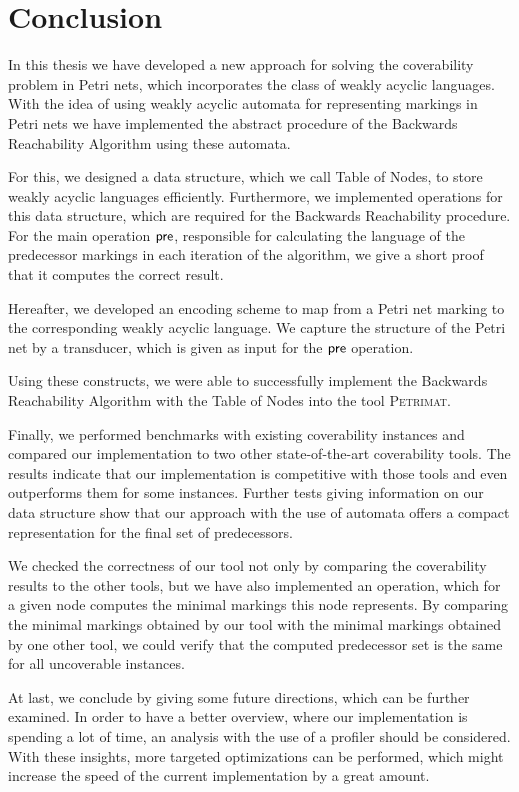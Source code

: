 \chapter{Conclusion}\label{chapter:conclusion}

In this thesis we have developed a new approach for solving the coverability problem in Petri nets, which incorporates the class of weakly acyclic languages. With the idea of using weakly acyclic automata for representing markings in Petri nets we have implemented the abstract procedure of the Backwards Reachability Algorithm using these automata.
 
For this, we designed a data structure,  which we call Table of Nodes, to store weakly acyclic languages efficiently. Furthermore, we implemented operations for this data structure, which are required for the Backwards Reachability procedure. 
For the main operation $\operatorname{\textsf{pre}}$, responsible for calculating the language of the predecessor markings in each iteration of the algorithm, we give a short proof that it computes the correct result.

Hereafter, we developed an encoding scheme to map from a Petri net marking to the corresponding weakly acyclic language. We capture the structure of the Petri net by a transducer, which is given as input for the $\operatorname{\textsf{pre}}$ operation. 

Using these constructs, we were able to successfully implement the Backwards Reachability Algorithm with the Table of Nodes into the tool \textsc{Petrimat}.

Finally, we performed benchmarks with existing coverability instances and compared our implementation to two other state-of-the-art coverability tools.
The results indicate that our implementation is competitive with those tools and even outperforms them for some instances. Further tests giving information on our data structure show that our approach with the use of automata offers a compact representation for the final set of predecessors. 

We checked the correctness of our tool not only by comparing the coverability results to the other tools, but we have also implemented an operation, which for a given node computes the minimal markings this node represents. By comparing the minimal markings obtained by our tool with the minimal markings obtained by one other tool, we could verify that the computed predecessor set is the same for all uncoverable instances. 

At last, we conclude by giving some future directions, which can be further examined.
In order to have a better overview, where our implementation is spending a lot of time, an analysis with the use of a profiler should be considered. With these insights, more targeted optimizations can be performed, which might increase the speed of the current implementation by a great amount. 

